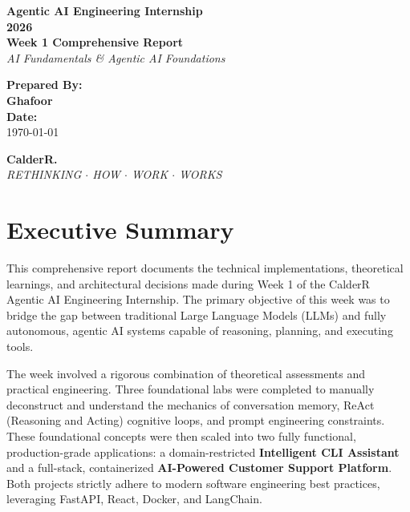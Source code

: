 \documentclass[12pt, a4paper]{article}
\begin{document}
\begin{titlepage}
    \centering
    \vspace*{2cm}
    
    {\Huge \textbf{\textcolor{primary}{Agentic AI Engineering Internship}}} \\[0.5cm]
    {\Huge \textbf{\textcolor{primary}{2026}}} \\[1.5cm]
    
    {\LARGE \textbf{Week 1 Comprehensive Report}} \\[0.5cm]
    {\Large \textit{AI Fundamentals \& Agentic AI Foundations}} \\[2cm]
    
    \begin{tcolorbox}[colback=accent, colframe=primary, rounded corners, boxrule=1.5pt, width=0.75\textwidth, arc=4mm]
        \centering
        \vspace{0.4cm}
        {\Large \textbf{Prepared By:}} \\[0.2cm]
        {\Large \textbf{Ghafoor}} \\[0.4cm]
        {\large \textbf{Date:}} \\
        {\large \today}
        \vspace{0.4cm}
    \end{tcolorbox}
    
    \vfill
    
    {\huge \textbf{\textcolor{secondary}{CalderR.}}} \\[0.2cm]
    {\large \textit{RETHINKING $\cdot$ HOW $\cdot$ WORK $\cdot$ WORKS}}
    \vspace*{1cm}
\end{titlepage}

\tableofcontents
\newpage

\section{Executive Summary}
This comprehensive report documents the technical implementations, theoretical learnings, and architectural decisions made during Week 1 of the CalderR Agentic AI Engineering Internship. The primary objective of this week was to bridge the gap between traditional Large Language Models (LLMs) and fully autonomous, agentic AI systems capable of reasoning, planning, and executing tools.

The week involved a rigorous combination of theoretical assessments and practical engineering. Three foundational labs were completed to manually deconstruct and understand the mechanics of conversation memory, ReAct (Reasoning and Acting) cognitive loops, and prompt engineering constraints. These foundational concepts were then scaled into two fully functional, production-grade applications: a domain-restricted \textbf{Intelligent CLI Assistant} and a full-stack, containerized \textbf{AI-Powered Customer Support Platform}. Both projects strictly adhere to modern software engineering best practices, leveraging FastAPI, React, Docker, and LangChain.
\end{document}
